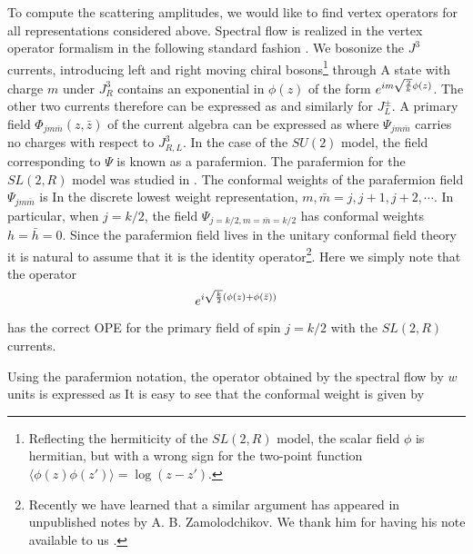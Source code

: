 To compute the scattering amplitudes, we would like to find vertex 
operators for all representations considered above. 
Spectral flow is realized in the vertex operator formalism in the following
standard fashion \cite{Gepner:1987hr}. 
We bosonize the $J^3$ currents,
introducing left and right moving chiral bosons\footnote{
Reflecting the hermiticity of the $SL(2,R)$ model, the scalar field $\phi$ 
is hermitian, but with a wrong sign for the
two-point function  $ \langle \phi(z) \phi(z') \rangle =
 \log(z-z')$.} through
A state with charge $m$ under $J_R^3$ contains an exponential in $\phi(z)$
of the form $e^{ im \sqrt{ 2 \over k} \phi(z) } $.
The other two currents therefore can be expressed as 
and similarly for $J_L^\pm$. A primary field $\Phi_{jm \bar m}
(z, \bar z)$ of the current algebra can be expressed as
where $\Psi_{jm\bar m}$ carries no charges with
respect to $J_{R,L}^3$. In the case of the $SU(2)$ model,
the field corresponding to $\Psi$ is known as a parafermion. 
The parafermion for the $SL(2,R)$ model was studied in \cite{Lykken:1989ut}. 
The conformal weights of the parafermion field $\Psi_{jm\bar m}$
is 
{ }
In the discrete lowest weight representation, $m, \bar{m} = j, j+1, j+2,
\cdots$. In particular, when $j=k/2$, the field $\Psi_{j= k/2,m=\bar{m} =k/2}$
has conformal weights $h = \bar{h} = 0$. 
Since the parafermion field lives in the unitary conformal field theory
it is natural to assume that it is the identity operator\footnote{Recently
we have learned that a similar argument has appeared in unpublished
notes by A. B. Zamolodchikov. We thank him for having his note available
to us \cite{Zamolodchikov:unpub}.}.  Here we simply note that the operator 
$$e^{i\sqrt{{k\over2 }}(\phi(z) + \phi(\bar{z}))} $$
has the correct OPE for the primary field of spin $j=k/2$
with the $SL(2,R)$ currents.

Using the parafermion notation, the operator obtained by
the spectral flow by $w$ units is expressed as
It is easy to see that the conformal weight is given by 


